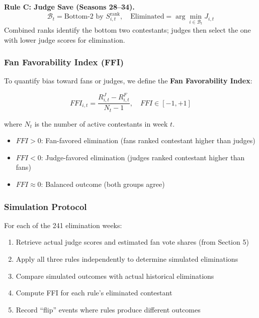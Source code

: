 \documentclass{mcmthesis}
\begin{document}
\textbf{Rule C: Judge Save (Seasons 28--34).}
\begin{equation}
\mathcal{B}_t = \text{Bottom-2 by } S^{\text{rank}}_{i,t}, \quad \text{Eliminated} = \arg\min_{i \in \mathcal{B}_t} J_{i,t}
\end{equation}
Combined ranks identify the bottom two contestants; judges then select the one with lower judge scores for elimination.

\subsubsection{Fan Favorability Index (FFI)}

To quantify bias toward fans or judges, we define the \textbf{Fan Favorability Index}:

\begin{equation}
FFI_{i,t} = \frac{R^{J}_{i,t} - R^{F}_{i,t}}{N_t - 1}, \quad FFI \in [-1, +1]
\end{equation}

where $N_t$ is the number of active contestants in week $t$.

\begin{itemize}
    \item $FFI > 0$: Fan-favored elimination (fans ranked contestant higher than judges)
    \item $FFI < 0$: Judge-favored elimination (judges ranked contestant higher than fans)
    \item $FFI \approx 0$: Balanced outcome (both groups agree)
\end{itemize}

\subsubsection{Simulation Protocol}

For each of the 241 elimination weeks:
\begin{enumerate}
    \item Retrieve actual judge scores and estimated fan vote shares (from Section 5)
    \item Apply all three rules independently to determine simulated eliminations
    \item Compare simulated outcomes with actual historical eliminations
    \item Compute FFI for each rule's eliminated contestant
    \item Record ``flip'' events where rules produce different outcomes
\end{enumerate}
\end{document}

